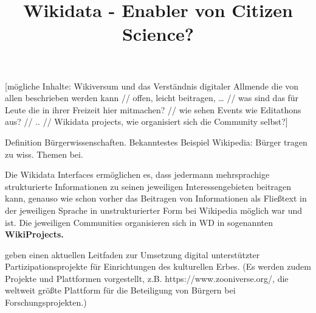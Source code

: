 \documentclass{article}
\begin{document}
\title{Wikidata - Enabler von Citizen Science?}

\maketitle





[mögliche Inhalte: Wikiversum und das Verständnis digitaler Allmende die von allen beschrieben werden kann // offen, leicht beitragen, … // was sind das für Leute die in ihrer Freizeit hier mitmachen? // wie sehen Events wie Editathons aus? // .. // Wikidata projects, wie organisiert sich die Community selbst?]


Definition Bürgerwissenschaften. Bekanntestes Beispiel Wikipedia: Bürger tragen zu wiss. Themen bei.


Die Wikidata Interfaces ermöglichen es, dass jedermann mehrsprachige strukturierte Informationen zu seinen jeweiligen Interessengebieten beitragen kann, genauso wie schon vorher das Beitragen von Informationen als Fließtext in der jeweiligen Sprache in unstrukturierter Form bei Wikipedia möglich war und ist. Die jeweiligen Communities organisieren sich in WD in sogenannten \textbf{WikiProjects.}


\autocite{ridge_collective_2021} geben einen aktuellen Leitfaden zur Umsetzung digital unterstützter Partizipationsprojekte für Einrichtungen des kulturellen Erbes. (Es werden zudem Projekte und Plattformen vorgestellt, z.B. https://www.zooniverse.org/, die weltweit größte Plattform für die Beteiligung von Bürgern bei Forschungsprojekten.)





\printbibliography[title={Literaturverzeichnis}]
\end{document}

